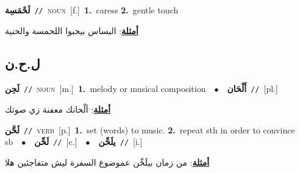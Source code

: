 \documentclass[10pt,a4paper,twoside]{article} %
\begin{document}
\begin{multicols}{2}
{\setlength\topsep{0pt}\textbf{\foreignlanguage{arabic}{لَحْمَسِة}}\ {\color{gray}\texttt{//}\color{black}}\ \textsc{noun}\ [f.]\ \textbf{1.}~caress  \textbf{2.}~gentle touch\  \begin{flushright}\color{gray}\foreignlanguage{arabic}{\textbf{\underline{\foreignlanguage{arabic}{أمثلة}}}: البساس بيحبوا اللحمسة والحنية}\end{flushright}\color{black}} \vspace{2mm}

\vspace{-3mm}
\subsection*{\color{blue}\foreignlanguage{arabic}{ل.ح.ن}\color{blue}{}} 

{\setlength\topsep{0pt}\textbf{\foreignlanguage{arabic}{لَحِن}}\ {\color{gray}\texttt{//}\color{black}}\ \textsc{noun}\ [m.]\ \textbf{1.}~melody or musical composition\ \ $\bullet$\ \ \setlength\topsep{0pt}\textbf{\foreignlanguage{arabic}{أَلْحَان}}\ {\color{gray}\texttt{//}\color{black}}\ [pl.]\  \begin{flushright}\color{gray}\foreignlanguage{arabic}{\textbf{\underline{\foreignlanguage{arabic}{أمثلة}}}: ألْحانك معفنة زي صوتك}\end{flushright}\color{black}} \vspace{2mm}

{\setlength\topsep{0pt}\textbf{\foreignlanguage{arabic}{لَحَّن}}\ {\color{gray}\texttt{//}\color{black}}\ \textsc{verb}\ [p.]\ \textbf{1.}~set (words) to music.  \textbf{2.}~repeat sth in order to convince sb\ \ $\bullet$\ \ \setlength\topsep{0pt}\textbf{\foreignlanguage{arabic}{لَحِّن}}\ {\color{gray}\texttt{//}\color{black}}\ [c.]\ \ $\bullet$\ \ \setlength\topsep{0pt}\textbf{\foreignlanguage{arabic}{يلَحِّن}}\ {\color{gray}\texttt{//}\color{black}}\ [i.]\  \begin{flushright}\color{gray}\foreignlanguage{arabic}{\textbf{\underline{\foreignlanguage{arabic}{أمثلة}}}: من زمان بيلَحِّن عموضوع السفرة ليش متفاجئين هلا}\end{flushright}\color{black}} \vspace{2mm}


\end{multicols}
\end{document}
